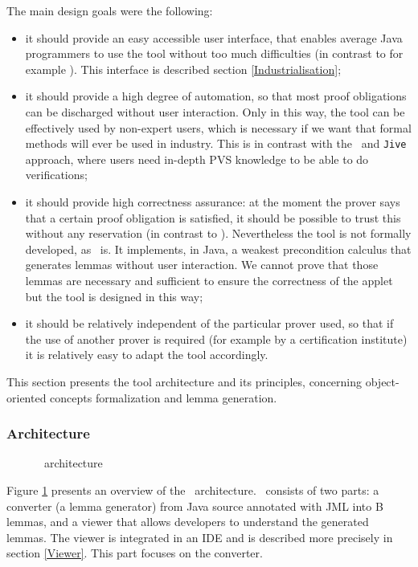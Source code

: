  The main design goals were the following:
 \begin{itemize}
 \item it should provide an easy accessible user interface, that enables average Java programmers to use the tool
 without too much difficulties (in contrast to for example \LOOP). This interface is
described section \ref{Industrialisation};
 \item it should provide a high degree of automation, so that most proof obligations can be discharged without user
 interaction. Only in this way, the tool can be effectively used by non-expert users, which is necessary if we want that
 formal methods will ever be used in industry. This is in
contrast with the \LOOP\ and \texttt{Jive} approach, where users need in-depth PVS knowledge to be able to do
verifications;
 \item it should provide high correctness assurance: at the moment the prover says that a certain proof obligation
is satisfied, it should be possible to trust this without any reservation (in contrast to \ESC). Nevertheless
the tool is not formally developed, as \LOOP\ is. It implements, in Java, a weakest precondition calculus that
generates lemmas without user interaction. We cannot prove that those lemmas are necessary and sufficient to
ensure the correctness of the applet but the tool is designed in this way;
 \item it should be relatively independent of the particular prover used, so that if the use of another prover is
 required (for example by a certification institute) it is relatively easy to adapt the tool accordingly.
\end{itemize}

 This section presents the tool architecture and its principles,
 concerning object-oriented concepts formalization and lemma generation.
\subsubsection{Architecture}
\begin{figure}[tp]
 \caption{\JACK\ architecture}
 \label{JACKarchitecture}
\end{figure}
 Figure \ref{JACKarchitecture} presents an overview of the \JACK\
 architecture.  \JACK\ consists of two parts: a converter (a lemma generator) from
 Java source annotated with JML into B lemmas, and a viewer that
 allows developers to understand the generated
 lemmas.  The viewer is integrated in an IDE and is described more precisely in section
 \ref{Viewer}.  This part focuses on the converter.

